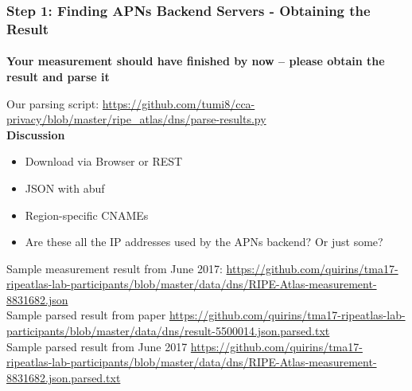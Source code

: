 \clearpage
\begin{frame}
\frametitle{Step 1: Finding APNs Backend Servers - Obtaining the Result}
\framesubtitle{}
\textbf{Your measurement should have finished by now -- please obtain the result and parse it} 

Our parsing script: \url{https://github.com/tumi8/cca-privacy/blob/master/ripe\_atlas/dns/parse-results.py}\\

\pause
 \textbf{Discussion}
 \vspace{-5mm}
\begin{itemize}
	\item Download via Browser or REST
	\item JSON with abuf
	\item Region-specific CNAMEs
	\item Are these all the IP addresses used by the APNs backend? Or just some?
\end{itemize}
\small{
Sample measurement result from June 2017: \url{https://github.com/quirins/tma17-ripeatlas-lab-participants/blob/master/data/dns/RIPE-Atlas-measurement-8831682.json}\\
Sample parsed result from paper \url{https://github.com/quirins/tma17-ripeatlas-lab-participants/blob/master/data/dns/result-5500014.json.parsed.txt} \\
Sample parsed result from June 2017 \url{https://github.com/quirins/tma17-ripeatlas-lab-participants/blob/master/data/dns/RIPE-Atlas-measurement-8831682.json.parsed.txt}\\
}

\end{frame}
\clearpage


